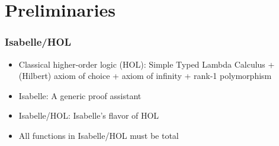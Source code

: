\documentclass[aspectratio=169,10pt]{beamer}
\begin{document}
\section{Preliminaries}
\begin{frame}[fragile]
  \frametitle{Isabelle/HOL}
  \begin{itemize}
    \item Classical higher-order logic (HOL): Simple Typed Lambda Calculus + (Hilbert) axiom of choice + axiom of infinity + rank-1 polymorphism
          \pause
    \item Isabelle: A generic proof assistant
          \begin{overlayarea}{\textwidth}{.45\textheight}
            \centering
            \begin{figure}
              \centering
            \end{figure}
          \end{overlayarea}
    \item Isabelle/HOL: Isabelle's flavor of HOL
    \item All functions in Isabelle/HOL must be total
  \end{itemize}
\end{frame}
\end{document}
